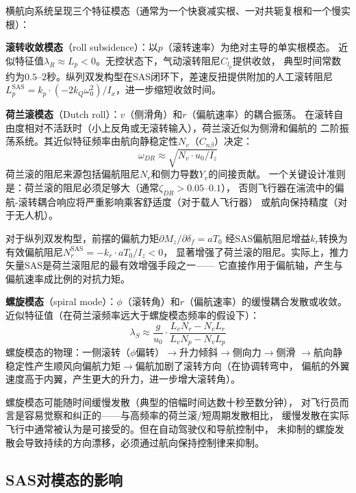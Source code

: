 \documentclass[a4paper,12pt]{ctexart}
\theoremstyle{plain}
\theoremstyle{definition}
\begin{document}
横航向系统呈现三个特征模态（通常为一个快衰减实根、一对共轭复根和一个慢实根）\cite{etkin1982dynamics}：

\textbf{滚转收敛模态}（roll subsidence）：以$p$（滚转速率）为绝对主导的单实根模态。
近似特征值$\lambda_R \approx L_p < 0$。无控状态下，气动滚转阻尼$C_{l_p}$提供收敛，
典型时间常数约为$0.5$--$2$秒。纵列双发构型在SAS闭环下，差速反扭提供附加的人工滚转阻尼
$L_p^{\text{SAS}} = k_p \cdot (-2 k_Q \omega_0^2) / I_x $，进一步缩短收敛时间。

\textbf{荷兰滚模态}（Dutch roll）：$v$（侧滑角）和$r$（偏航速率）的耦合振荡。
在滚转自由度相对不活跃时（小上反角或无滚转输入），荷兰滚近似为侧滑和偏航的
二阶振荡系统。其近似特征频率由航向静稳定性$N_v$（$C_{n\beta}$）决定：
\begin{equation}
    \omega_{DR} \approx \sqrt{N_v \cdot u_0 / I_z}
\end{equation}
荷兰滚的阻尼来源包括偏航阻尼$N_r$和侧力导数$Y_v$的间接贡献。
一个关键设计准则是：荷兰滚的阻尼必须足够大（通常$\zeta_{DR} > 0.05$--$0.1$），
否则飞行器在湍流中的偏航-滚转耦合响应将严重影响乘客舒适度（对于载人飞行器）
或航向保持精度（对于无人机）。

对于纵列双发构型，前摆的偏航力矩$\partial M_z / \partial \delta_f = a T_0$
经SAS偏航阻尼增益$k_r$转换为有效偏航阻尼$N_r^{\text{SAS}} = -k_r \cdot a T_0 / I_z < 0$，
显著增强了荷兰滚的阻尼。实际上，推力矢量SAS是荷兰滚阻尼的最有效增强手段之一——
它直接作用于偏航轴，产生与偏航速率成比例的对抗力矩。

\textbf{螺旋模态}（spiral mode）：$\phi$（滚转角）和$r$（偏航速率）的缓慢耦合发散或收敛。
近似特征值（在荷兰滚频率远大于螺旋模态频率的假设下）：
\begin{equation}
    \lambda_S \approx \frac{g}{u_0} \cdot
    \frac{L_v N_r - N_v L_r}{L_v N_p - N_v L_p}
\end{equation}
螺旋模态的物理：一侧滚转（$\phi$偏转）$\to$升力倾斜$\to$侧向力$\to$侧滑
$\to$航向静稳定性产生顺风向偏航力矩$\to$偏航加剧了滚转方向（在协调转弯中，
偏航的外翼速度高于内翼，产生更大的升力，进一步增大滚转角）。

螺旋模态可能随时间缓慢发散（典型的倍幅时间达数十秒至数分钟），
对飞行员而言是容易觉察和纠正的——与高频率的荷兰滚/短周期发散相比，
缓慢发散在实际飞行中通常被认为是可接受的。但在自动驾驶仪和导航控制中，
未抑制的螺旋发散会导致持续的方向漂移，必须通过航向保持控制律来抑制。

\subsection{SAS对模态的影响}
\end{document}
